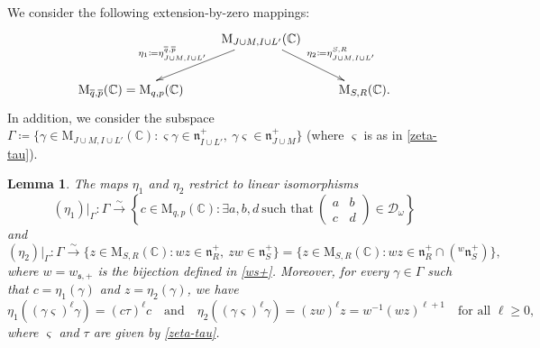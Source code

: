 \documentclass[11pt]{article}
\newtheorem{lemma}[theo]{Lemma}
\theoremstyle{definition}
\numberwithin{equation}{section}
\newcommand{\fs}{\mathfrak{s}}
\newcommand{\fn}{\mathfrak{n}}
\newcommand{\Mat}{\mathrm{M}}
\newcommand{\condir}{\mathcal{D}}
\newcommand{\intp}{\overline{p}}
\newcommand{\intq}{\overline{q}}
\newcommand{\mC}{\mathbb{C}}
\begin{document}
We consider the following extension-by-zero mappings:
\[
\xymatrix{
& \ar_{\eta_1\coloneqq \eta_{J\cup M,I\cup L'}^{\intq,\intp}\quad}[ld] \Mat_{J\cup M,I\cup L'}(\mC) \ar^{\quad\eta_2\coloneqq \eta_{J\cup M,I\cup L'\\ }^{S,R}}[rd] &\\
\Mat_{\intq,\intp}(\mC)=\Mat_{q,p}(\mC) &  & \Mat_{S,R}(\mC).}
\]
In addition, we consider the subspace $\Gamma\coloneqq \{\gamma\in \Mat_{J\cup M,I\cup L'}(\mC):\varsigma \gamma\in\fn_{I\cup L'}^+,\ \gamma\varsigma\in\fn_{J\cup M}^+\}$ (where $\varsigma$ is as in \eqref{zeta-tau}).

\begin{lemma}
\label{L4.9}
The maps $\eta_1$ and $\eta_2$ restrict to linear isomorphisms
\[(\eta_1)|_{\Gamma}:\Gamma\stackrel{\sim}{\longrightarrow} \left\{ c\in \Mat_{q,p}(\mC):\exists a,b,d\ \mbox{such that}\ \begin{pmatrix} a & b\\ c & d \end{pmatrix}\in\condir_\omega \right\}\]
and\[(\eta_2)|_\Gamma:\Gamma\stackrel{\sim}{\to} \{z\in\Mat_{S,R}(\mC):wz\in\fn_R^+,\ zw\in\fn_S^+\}=\{z\in\Mat_{S,R}(\mC):wz\in\fn_R^+\cap({}^w\fn_S^+)\},\]
where $w=w_{\fs,+}$ is the bijection defined in \eqref{ws+}.
Moreover, for every $\gamma\in\Gamma$ such that $c=\eta_1(\gamma)$ and $z=\eta_2(\gamma)$, we have
\[\eta_1((\gamma\varsigma)^{\ell}\gamma)=(c\tau)^\ell c\quad\mbox{and}\quad \eta_2((\gamma\varsigma)^\ell\gamma)=(zw)^\ell z=w^{-1}(wz)^{\ell+1}\quad\mbox{for all $\ell\geq 0$},\]
where $\varsigma$ and $\tau$ are given by \eqref{zeta-tau}.
\end{lemma}
\end{document}
